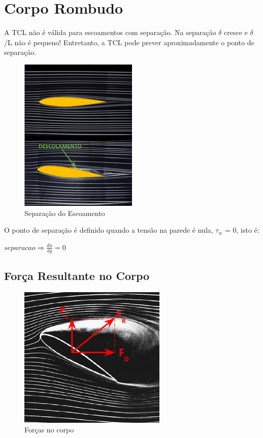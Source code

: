 \documentclass[a4paper, 12pt]{article}
\begin{document}
\section{Corpo Rombudo}
	A TCL não é válida para escoamentos com separação.
	Na separação $\delta$ cresce e $\delta$/L não é pequeno!
	Entretanto, a TCL pode prever aproximadamente o ponto de separação.
	\begin{figure}[h]
		\centering
		\includegraphics[width=0.5\linewidth]{imagens/sep}
		\caption{Separação do Escoamento}
		\label{fig:sep}
	\end{figure}
	O ponto de separação é definido quando  a  tensão  na  parede é nula, $\tau_w$ = 0, isto é:
		\begin{center}
			\Large
			$
			separacao \Rightarrow \frac{du}{dy} = 0
			$
		\end{center}
	\newpage
\subsection{Força Resultante no Corpo}
	\begin{figure}[h]
		\centering
		\includegraphics[width=0.7\linewidth]{imagens/sep1}
		\caption{Forças no corpo}
		\label{fig:sep1}
	\end{figure}
\end{document}
